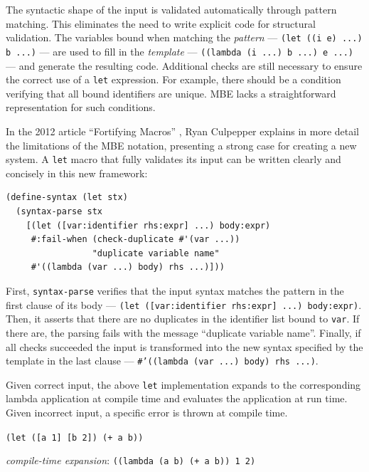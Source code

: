\documentclass{juliacon}
\begin{document}
The syntactic shape of the input is validated automatically through
pattern matching. This eliminates the need to write explicit code for
structural validation. The variables bound when matching the \emph{pattern}
— \texttt{(let ((i e) ...) b ...)} — are used to fill in the \emph{template} —
\texttt{((lambda (i ...) b ...) e ...)} — and generate the resulting
code. Additional checks are still necessary to ensure the correct use
of a \texttt{let} expression. For example, there should be a condition
verifying that all bound identifiers are unique. MBE lacks a
straightforward representation for such conditions.

In the 2012 article ``Fortifying Macros'' \cite{fortifying_macros},
Ryan Culpepper explains in more detail the limitations of the MBE
notation, presenting a strong case for creating a new system. A \texttt{let}
macro that fully validates its input can be written clearly and
concisely in this new framework:

\begin{lstlisting}[language=racket]
(define-syntax (let stx)
  (syntax-parse stx
    [(let ([var:identifier rhs:expr] ...) body:expr)
     #:fail-when (check-duplicate #'(var ...))
                 "duplicate variable name"
     #'((lambda (var ...) body) rhs ...)]))
\end{lstlisting}

First, \texttt{syntax-parse} verifies that the input syntax matches the
pattern in the first clause of its body — \texttt{(let ([var:identifier
rhs:expr] ...) body:expr)}. Then, it asserts that there are no
duplicates in the identifier list bound to \texttt{var}. If there are, the
parsing fails with the message ``duplicate variable name''. Finally,
if all checks succeeded the input is transformed into the new syntax
specified by the template in the last clause — \texttt{\#’((lambda (var ...)
body) rhs ...)}.

Given correct input, the above \texttt{let} implementation expands to the
corresponding lambda application at compile time and evaluates the
application at run time. Given incorrect input, a specific error is
thrown at compile time.

\vspace{1em}

\noindent
\texttt{(let ([a 1] [b 2]) (+ a b))}

\vspace{0.05cm}
\noindent\hspace{0.3cm}\textit{compile-time expansion}: \texttt{((lambda (a b) (+ a b)) 1 2)}
\end{document}
